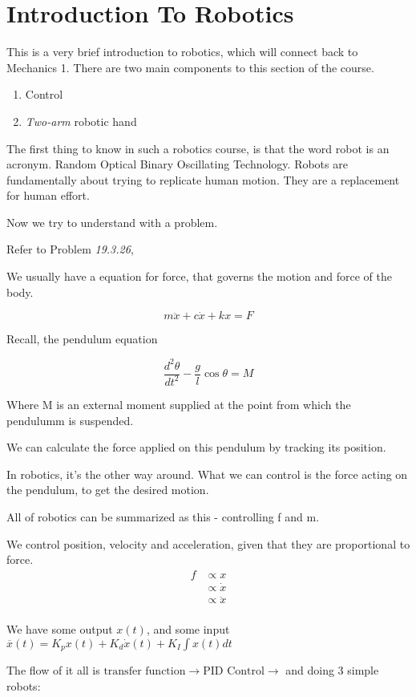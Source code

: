 \documentclass{report}
\begin{document}
\chapter{Introduction To Robotics}
This is a very brief introduction to robotics, which will connect back to Mechanics 1. 
There are two main components to this section of the course.
\begin{enumerate}
	\item Control
	\item \textit{Two-arm} robotic hand
\end{enumerate}

The first thing to know in such a robotics course, is that the word robot is an acronym. Random Optical Binary Oscillating Technology. Robots are fundamentally about trying to replicate human motion. They are a replacement for human effort. 
 
Now we try to understand with a problem.

Refer to Problem \textit{19.3.26},

We usually have a equation for force, that governs the motion and force of the body.

\[ 
	m\ddot{x} + c\dot{x} + kx = F
\]

Recall, the pendulum equation

\[ 
	\frac{d^2 \theta}{dt^2} - \frac{g}{l} \cos{\theta} = M
\]

Where M is an external moment supplied at the point from which the pendulumm is suspended.

We can calculate the force applied on this pendulum by tracking its position.

In robotics, it's the other way around. What we can control is the force acting on the pendulum, to get the desired motion.

All of robotics can be summarized as this - controlling f and m.

We control position, velocity and acceleration, given that they are proportional to force.
\begin{align*}
	f &\propto x \\
	  &\propto \dot{x} \\
	  &\propto \ddot{x} \\
\end{align*}

We have some output $x(t)$, and some input $\overline{x}(t) = K_p x(t) + K_d \dot{x}(t) + K_I \int x(t) dt$ 

The flow of it all is $\text{transfer  function} \rightarrow \text{PID Control}\rightarrow$  and doing 3 simple robots:
\end{document}
